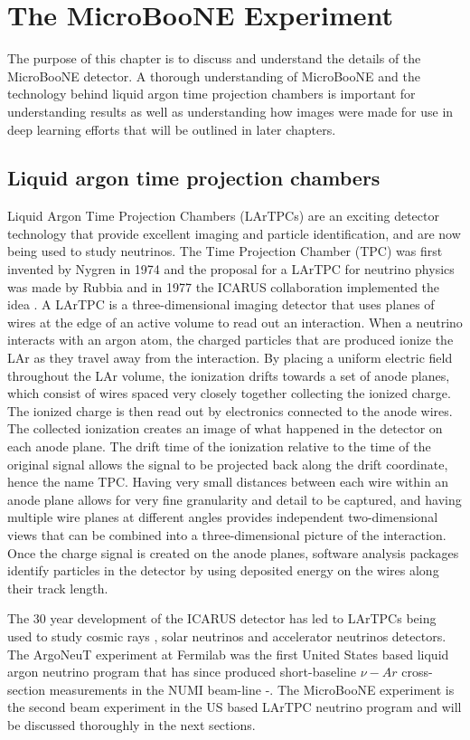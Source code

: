 \chapter{The MicroBooNE Experiment}\label{ch:microboone}
The purpose of this chapter is to discuss and understand the details of the MicroBooNE detector. A thorough understanding of MicroBooNE and the technology behind liquid argon time projection chambers is important for understanding results as well as understanding how images were made for use in deep learning efforts that will be outlined in later chapters.   

\section{Liquid argon time projection chambers}
Liquid Argon Time Projection Chambers (LArTPCs) are an exciting detector technology that provide excellent imaging and particle identification, and are now being used to study neutrinos. The Time Projection Chamber (TPC) was first invented by Nygren in 1974 \cite{nygren} and the proposal for a LArTPC for neutrino physics was made by Rubbia \cite{rubbia} and in 1977 the ICARUS collaboration implemented the idea \cite{icarus}. A LArTPC is a three-dimensional imaging detector that uses planes of wires at the edge of an active volume to read out an interaction. When a neutrino interacts with an argon atom, the charged particles that are produced ionize the LAr as they travel away from the interaction. By placing a uniform electric field throughout the LAr volume, the ionization drifts towards a set of anode planes, which consist of wires spaced very closely together collecting the ionized charge. The ionized charge is then read out by electronics connected to the anode wires. The collected ionization creates an image of what happened in the detector on each anode plane. The drift time of the ionization relative to the time of the original signal allows the signal to be projected back along the drift coordinate, hence the name TPC. Having very small distances between each wire within an anode plane allows for very fine granularity and detail to be captured, and having multiple wire planes at different angles provides independent two-dimensional views that can be combined into a three-dimensional picture of the interaction. Once the charge signal is created on the anode planes, software analysis packages identify particles in the detector by using deposited energy on the wires along their track length. 

The 30 year development of the ICARUS detector has led to LArTPCs being used to study cosmic rays \cite{lartpc_cosmic}, solar neutrinos \cite{lartpc_solar} and accelerator neutrinos \cite{lartpc_accelerator} detectors. The ArgoNeuT experiment at Fermilab was the first United States based liquid argon neutrino program that has since produced short-baseline $\nu-Ar$ cross-section measurements in the NUMI beam-line \cite{argoneut1}-\cite{argoneut4}. The MicroBooNE experiment is the second beam experiment in the US based LArTPC neutrino program and will be discussed thoroughly in the next sections.  

